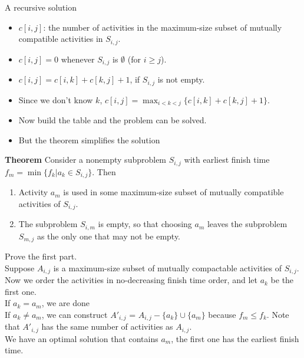 \documentclass{beamer}
\begin{document}
\begin{frame}{}
\begin{center}
{\large A recursive solution} 
\end{center}
\begin{itemize}
\item $c[i,j]$: the number of activities in the maximum-size subset of mutually compatible activities in $S_{i,j}$. 
\item $c[i,j]=0$ whenever $S_{i,j}$ is $\emptyset$ (for $i\ge j$).  
\item $c[i,j]=c[i,k]+c[k,j]+1$, if $S_{i,j}$ is not empty. 
\item Since we don't know $k$, 
 $c[i,j]=\max_{i<k<j} \{ c[i,k]+c[k,j]+1\}$. 
\end{itemize}
\end{frame}

\begin{frame}{}
\begin{itemize}
\item Now build the table and the problem can be solved. 
\item But the theorem simplifies the solution 
\end{itemize}
{\bf Theorem} Consider a nonempty subproblem $S_{i,j}$ with earliest finish time 
$f_m = \min\{f_k|a_k\in S_{i,j}\}$. Then
\begin{enumerate}
\item Activity $a_m$ is used in some maximum-size subset of mutually compatible activities of $S_{i,j}$.
\item The subproblem $S_{i,m}$ is empty, so that choosing $a_m$ leaves the subproblem $S_{m,j}$ as the only
one that may not be empty. 
\end{enumerate}
\end{frame}

\begin{frame}{}
 Prove the first part. \\
Suppose $A_{i,j}$ is a maximum-size subset of mutually
 compactable activities of $S_{i,j}$.\\
Now we order the activities in no-decreasing finish time order, and let $a_k$ be the first one. \\
If $a_k=a_m$, we are done \\ 
If $a_k\ne a_m$, we can construct $A'_{i,j}$ = $A_{i,j}-\{a_k\}\cup \{a_m\}$ because $f_m\le f_k$.
Note that $A'_{i,j}$ has the same number of activities as $A_{i,j}$. \\
We have an optimal solution that contains $a_m$, the first one has the earliest finish time. 
\end{frame}
\end{document}
